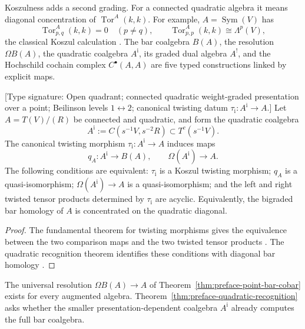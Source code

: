 Koszulness adds a second grading.  For a connected quadratic algebra
it means diagonal concentration of
\(\operatorname{Tor}^A(k,k)\).  For example,
\(A=\operatorname{Sym}(V)\) has
\[
 \operatorname{Tor}^{A}_{p,q}(k,k)=0\quad(p\ne q),
 \qquad
 \operatorname{Tor}^{A}_{p,p}(k,k)\cong\Lambda^p(V),
\]
the classical Koszul calculation
\cite[Proposition~3.4.13]{LV12}.  The bar coalgebra
\(B(A)\), the resolution \(\Omega B(A)\), the quadratic coalgebra
\(A^{\mathrm i}\), its graded dual algebra \(A^!\), and the
Hochschild cochain complex
\(C^\bullet(A,A)\) are five typed constructions linked by explicit
maps.

\begin{theorem}
\label{thm:preface-quadratic-recognition}
\textup{[Type signature: Open quadrant; connected quadratic
weight-graded presentation over a point; Beilinson levels
\(1\leftrightarrow2\); canonical twisting datum
\(\tau_{\mathrm i}\colon A^{\mathrm i}\to A\).]}
Let \(A=T(V)/(R)\) be connected and quadratic, and form the quadratic
coalgebra
\[
 A^{\mathrm i}:=C(s^{-1}V,s^{-2}R)\subset T^c(s^{-1}V).
\]
The canonical twisting morphism
\(\tau_{\mathrm i}\colon A^{\mathrm i}\to A\) induces maps
\[
 q_A\colon A^{\mathrm i}\longrightarrow B(A),
 \qquad
 \Omega(A^{\mathrm i})\longrightarrow A.
\]
The following conditions are equivalent: \(\tau_{\mathrm i}\) is a
Koszul twisting morphism; \(q_A\) is a quasi-isomorphism;
\(\Omega(A^{\mathrm i})\to A\) is a quasi-isomorphism; and the left
and right twisted tensor products determined by
\(\tau_{\mathrm i}\) are acyclic.  Equivalently, the bigraded bar
homology of \(A\) is concentrated on the quadratic diagonal.
\end{theorem}

\begin{proof}
The fundamental theorem for twisting morphisms gives the equivalence
between the two comparison maps and the two twisted tensor products
\cite[Theorem~2.3.2]{LV12}.  The quadratic recognition
theorem identifies these conditions with diagonal bar homology
\cite[Theorem~3.4.6]{LV12}.
\end{proof}

The universal resolution \(\Omega B(A)\to A\) of
Theorem~\ref{thm:preface-point-bar-cobar} exists for every augmented
algebra.  Theorem~\ref{thm:preface-quadratic-recognition} asks whether
the smaller presentation-dependent coalgebra \(A^{\mathrm i}\)
already computes the full bar coalgebra.

